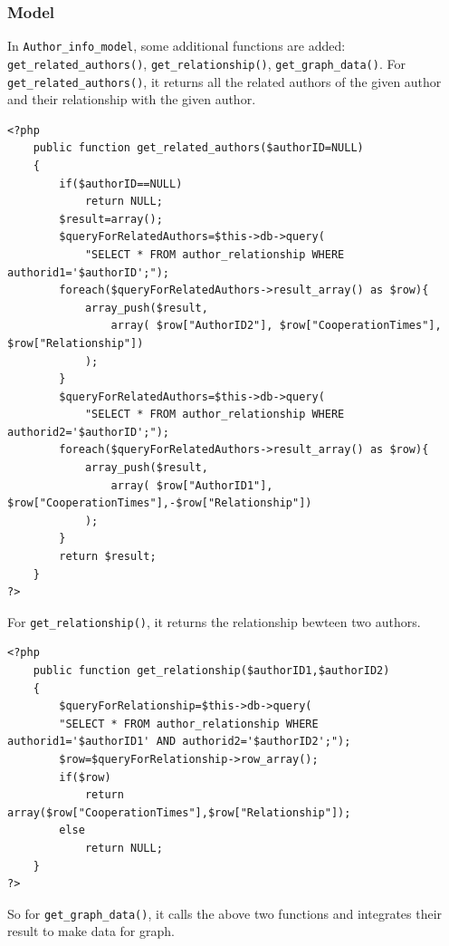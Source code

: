\documentclass[a4paper]{article}
\begin{document}
            \subsubsection{Model}
In \texttt{Author_info_model}, some additional functions are added: \texttt{get_related_authors()}, \texttt{get_relationship()}, \texttt{get_graph_data()}.
For \texttt{get_related_authors()}, it returns all the related authors of the given author and their relationship with the given author.
\begin{verbatim}
<?php
    public function get_related_authors($authorID=NULL)
    {
        if($authorID==NULL)
            return NULL;
        $result=array();
        $queryForRelatedAuthors=$this->db->query(
            "SELECT * FROM author_relationship WHERE authorid1='$authorID';");
        foreach($queryForRelatedAuthors->result_array() as $row){
            array_push($result,
                array( $row["AuthorID2"], $row["CooperationTimes"], $row["Relationship"])
            );
        }
        $queryForRelatedAuthors=$this->db->query(
            "SELECT * FROM author_relationship WHERE authorid2='$authorID';");
        foreach($queryForRelatedAuthors->result_array() as $row){
            array_push($result, 
                array( $row["AuthorID1"], $row["CooperationTimes"],-$row["Relationship"])
            );
        }
        return $result;
    }
?>
\end{verbatim}
For \texttt{get_relationship()}, it returns the relationship bewteen two authors.
\begin{verbatim}
<?php
    public function get_relationship($authorID1,$authorID2)
    {
        $queryForRelationship=$this->db->query(
        "SELECT * FROM author_relationship WHERE authorid1='$authorID1' AND authorid2='$authorID2';");
        $row=$queryForRelationship->row_array();
        if($row)
            return array($row["CooperationTimes"],$row["Relationship"]);
        else
            return NULL;
    }
?>
\end{verbatim}
So for \texttt{get_graph_data()}, it calls the above two functions and integrates their result to make data for graph.
\end{document}
